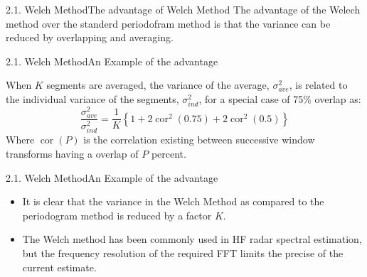 \documentclass[12pt]{beamer}
\begin{document}
\begin{frame}{2.1. Welch Method}{The advantage of Welch Method}
  The advantage of the Welech method over the standerd periodofram method is that the {\color{red} variance can be reduced} by overlapping and averaging.
  
\end{frame}

\begin{frame}{2.1. Welch Method}{An Example of the advantage}
  \begin{example}
    When $K$ segments are averaged, the variance of the average, $\sigma^2_{ave}$, is related to the individual variance of the segments, $\sigma^2_{ind}$, for a special case of 75\% overlap as:
  \begin{equation}
    \frac{\sigma_{{ave }}^{2}}{\sigma_{{ind }}^{2}}=\frac{1}{K}\left\{1+2 \operatorname{cor}^{2}(0.75)+2 \operatorname{cor}^{2}(0.5)\right\}
  \end{equation} 
  Where $\operatorname{cor}(P)$ is the correlation existing between successive window transforms having a overlap of $P$ percent\cite{TRETHEWEY2000267}.
  \end{example}
\end{frame}

\begin{frame}{2.1. Welch Method}{An Example of the advantage}
  \begin{example}
     \begin{itemize}
    \item It is clear that the variance in the Welch Method as compared to the periodogram method is {\color{red} reduced by a factor $K$}.
    \item The Welch method has been commonly used in HF radar spectral estimation, but the {\color{red} frequency resolution} of the required FFT limits the precise of the current estimate.
  \end{itemize}
  \end{example}
 
   
\end{frame}
\end{document}
